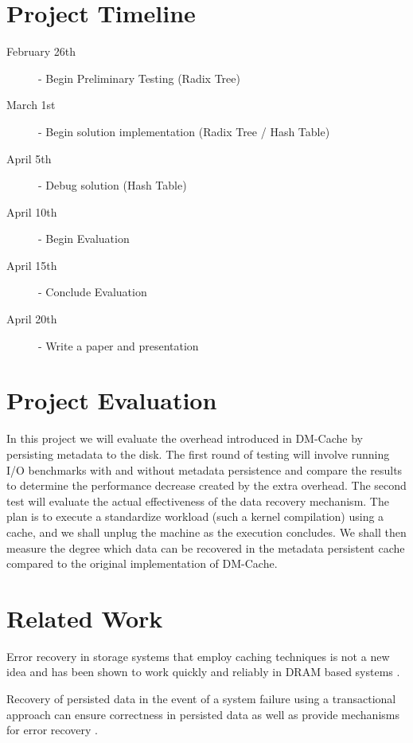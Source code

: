 \documentclass[letterpaper,12pt]{article}
\begin{document}

\pagebreak
\section*{Project Timeline}

\begin{description}
  \item[February 26th] - Begin Preliminary Testing (Radix Tree)
  \item[March 1st] - Begin solution implementation (Radix Tree / Hash
  Table)
  \item[April 5th] - Debug solution (Hash Table)
  \item[April 10th] - Begin Evaluation
  \item[April 15th] - Conclude Evaluation
  \item[April 20th] - Write a paper and presentation
\end{description}


\section*{Project Evaluation}

In this project we will evaluate the overhead introduced in DM-Cache
by persisting metadata to the disk. The first round of testing will
involve running I/O benchmarks with and without metadata persistence
and compare the results to determine the performance decrease created
by the extra overhead. The second test will evaluate the actual
effectiveness of the data recovery mechanism. The plan is to execute a
standardize workload (such a kernel compilation) using a cache, and we
shall unplug the machine as the execution concludes. We shall then
measure the degree which data can be recovered in the metadata
persistent cache compared to the original implementation of DM-Cache.


\section*{Related Work}

Error recovery in storage systems that employ caching techniques is
not a new idea and has been shown to work quickly and reliably in DRAM
based systems \cite{RAMCloud}.

Recovery of persisted data in the event of a system failure using a
transactional approach can ensure correctness in persisted data as
well as provide mechanisms for error recovery \cite{NVHeaps}.
\end{document}

